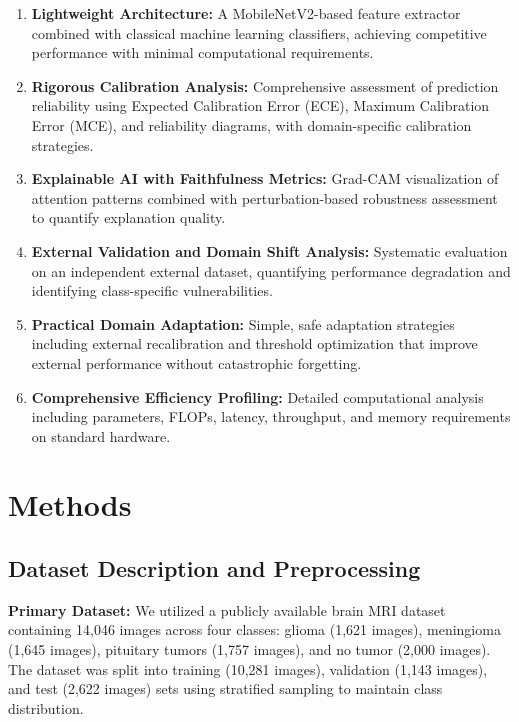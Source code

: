 \documentclass[11pt,a4paper]{article}
\begin{document}
\begin{enumerate}
    \item \textbf{Lightweight Architecture:} A MobileNetV2-based feature extractor combined with classical machine learning classifiers, achieving competitive performance with minimal computational requirements.
    
    \item \textbf{Rigorous Calibration Analysis:} Comprehensive assessment of prediction reliability using Expected Calibration Error (ECE), Maximum Calibration Error (MCE), and reliability diagrams, with domain-specific calibration strategies.
    
    \item \textbf{Explainable AI with Faithfulness Metrics:} Grad-CAM visualization of attention patterns combined with perturbation-based robustness assessment to quantify explanation quality.
    
    \item \textbf{External Validation and Domain Shift Analysis:} Systematic evaluation on an independent external dataset, quantifying performance degradation and identifying class-specific vulnerabilities.
    
    \item \textbf{Practical Domain Adaptation:} Simple, safe adaptation strategies including external recalibration and threshold optimization that improve external performance without catastrophic forgetting.
    
    \item \textbf{Comprehensive Efficiency Profiling:} Detailed computational analysis including parameters, FLOPs, latency, throughput, and memory requirements on standard hardware.
\end{enumerate}

\section{Methods}

\subsection{Dataset Description and Preprocessing}

\textbf{Primary Dataset:} We utilized a publicly available brain MRI dataset containing 14,046 images across four classes: glioma (1,621 images), meningioma (1,645 images), pituitary tumors (1,757 images), and no tumor (2,000 images). The dataset was split into training (10,281 images), validation (1,143 images), and test (2,622 images) sets using stratified sampling to maintain class distribution.
\end{document}
